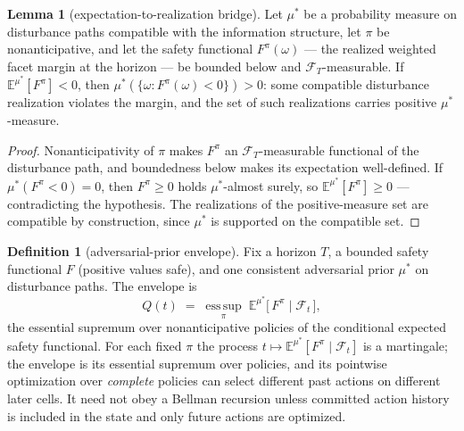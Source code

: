 \documentclass[10pt,twocolumn]{article}
\theoremstyle{definition}
\newtheorem{definition}{Definition}
\newtheorem{lemma}{Lemma}
\begin{document}
\begin{lemma}[expectation-to-realization bridge]\label{lem:bridge}
Let $\mu^{*}$ be a probability measure on disturbance paths compatible with
the information structure, let $\pi$ be nonanticipative, and let the
safety functional $F^{\pi}(\omega)$ --- the realized weighted facet margin
at the horizon --- be bounded below and $\mathcal{F}_{T}$-measurable. If
$\mathbb{E}^{\mu^{*}}[F^{\pi}] < 0$, then
$\mu^{*}(\{\omega: F^{\pi}(\omega) < 0\}) > 0$: some compatible disturbance
realization violates the margin, and the set of such realizations carries
positive $\mu^{*}$-measure.
\end{lemma}
\begin{proof}
Nonanticipativity of $\pi$ makes $F^{\pi}$ an $\mathcal{F}_{T}$-measurable
functional of the disturbance path, and boundedness below makes its
expectation well-defined. If $\mu^{*}(F^{\pi} < 0) = 0$, then
$F^{\pi} \ge 0$ holds $\mu^{*}$-almost surely, so
$\mathbb{E}^{\mu^{*}}[F^{\pi}] \ge 0$ --- contradicting the hypothesis. The
realizations of the positive-measure set are compatible by construction,
since $\mu^{*}$ is supported on the compatible set.
\end{proof}

\begin{definition}[adversarial-prior envelope]\label{def:envelope}
Fix a horizon $T$, a bounded safety functional $F$ (positive values safe),
and one consistent adversarial prior $\mu^{*}$ on disturbance paths. The
envelope is
\[
Q(t) \;=\; \operatorname*{ess\,sup}_{\pi} \;
\mathbb{E}^{\mu^{*}}\bigl[\, F^{\pi} \;\big|\; \mathcal{F}_{t} \,\bigr],
\]
the essential supremum over nonanticipative policies of the conditional
expected safety functional. For each fixed $\pi$ the process
$t \mapsto \mathbb{E}^{\mu^{*}}[F^{\pi} \mid \mathcal{F}_{t}]$ is a
martingale; the envelope is its essential supremum over policies, and its
pointwise optimization over \emph{complete} policies can select
different past actions on different later cells. It need not obey a
Bellman recursion unless committed action history is included in the
state and only future actions are optimized.
\end{definition}
\end{document}

